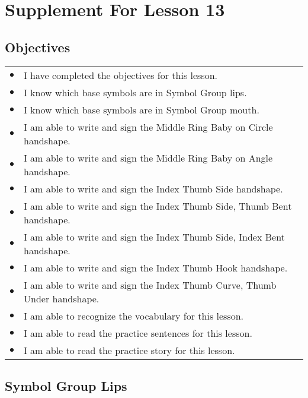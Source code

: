 \documentclass{article}
\begin{document}
\newfontfamily{}
\newfontfamily{}
\newcommand{\bul}{\hfil$\bullet$&}
\renewenvironment{glossary}{\begin{multicols}{5}\begin{center}}{\end{center}\end{multicols}}
\setcounter{secnumdepth}{0}
\setlength{\columnseprule}{1pt}

\section{Supplement For Lesson 13}

\subsection{Objectives}

\begin{tabular}{p{1cm}p{14cm}}
\bul I have completed the objectives for this lesson.\\
\bul I know which base symbols are in Symbol Group lips.\\
\bul I know which base symbols are in Symbol Group mouth.\\
\bul I am able to write and sign the Middle Ring Baby on Circle handshape.\\
\bul I am able to write and sign the Middle Ring Baby on Angle handshape.\\
\bul I am able to write and sign the Index Thumb Side handshape.\\
\bul I am able to write and sign the Index Thumb Side, Thumb Bent handshape.\\
\bul I am able to write and sign the Index Thumb Side, Index Bent handshape.\\
\bul I am able to write and sign the Index Thumb Hook handshape.\\
\bul I am able to write and sign the Index Thumb Curve, Thumb Under handshape.\\
\bul I am able to recognize the vocabulary for this lesson.\\
\bul I am able to read the practice sentences for this lesson.\\
\bul I am able to read the practice story for this lesson.\\
\end{tabular}

\subsection{Symbol Group Lips}
\end{document}

